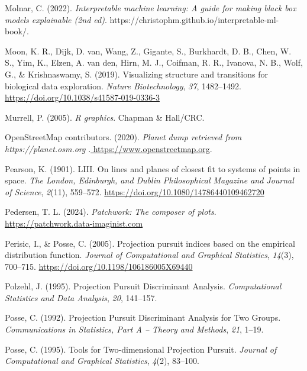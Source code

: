 \documentclass[
  letterpaper,
]{krantz}
\newlength{\cslhangindent}
\newenvironment{CSLReferences}[2] %
 {\begin{list}{}{%
  \setlength{\itemindent}{0pt}
  \setlength{\leftmargin}{0pt}
  \setlength{\parsep}{0pt}
  \ifodd #1
   \setlength{\leftmargin}{\cslhangindent}
   \setlength{\itemindent}{-1\cslhangindent}
  \fi
  \setlength{\itemsep}{#2\baselineskip}}}
 {\end{list}}
\begin{document}
\begin{CSLReferences}{1}{0}
Molnar, C. (2022). \emph{Interpretable machine learning: A guide for
making black box models explainable (2nd ed)}.
https://christophm.github.io/interpretable-ml-book/.

Moon, K. R., Dijk, D. van, Wang, Z., Gigante, S., Burkhardt, D. B.,
Chen, W. S., Yim, K., Elzen, A. van den, Hirn, M. J., Coifman, R. R.,
Ivanova, N. B., Wolf, G., \& Krishnaswamy, S. (2019). Visualizing
structure and transitions for biological data exploration. \emph{Nature
Biotechnology}, \emph{37}, 1482--1492.
\url{https://doi.org/10.1038/s41587-019-0336-3}

Murrell, P. (2005). \emph{R graphics}. Chapman \& Hall/CRC.

OpenStreetMap contributors. (2020). \emph{{Planet dump retrieved from
https://planet.osm.org
}}.\href{\%20https://www.openstreetmap.org\%20}{ https://www.openstreetmap.org}.

Pearson, K. (1901). LIII. On lines and planes of closest fit to systems
of points in space. \emph{The London, Edinburgh, and Dublin
Philosophical Magazine and Journal of Science}, \emph{2}(11), 559--572.
\url{https://doi.org/10.1080/14786440109462720}

Pedersen, T. L. (2024). \emph{Patchwork: The composer of plots}.
\url{https://patchwork.data-imaginist.com}

Perisic, I., \& Posse, C. (2005). Projection pursuit indices based on
the empirical distribution function. \emph{Journal of Computational and
Graphical Statistics}, \emph{14}(3), 700--715.
\url{https://doi.org/10.1198/106186005X69440}

Polzehl, J. (1995). Projection {P}ursuit {D}iscriminant {A}nalysis.
\emph{Computational Statistics and Data Analysis}, \emph{20}, 141--157.

Posse, C. (1992). Projection {P}ursuit {D}iscriminant {A}nalysis for
{T}wo {G}roups. \emph{Communications in Statistics, Part A -- Theory and
Methods}, \emph{21}, 1--19.

Posse, C. (1995). Tools for {T}wo-dimensional {P}rojection {P}ursuit.
\emph{Journal of Computational and Graphical Statistics}, \emph{4}(2),
83--100.


\end{CSLReferences}
\end{document}
